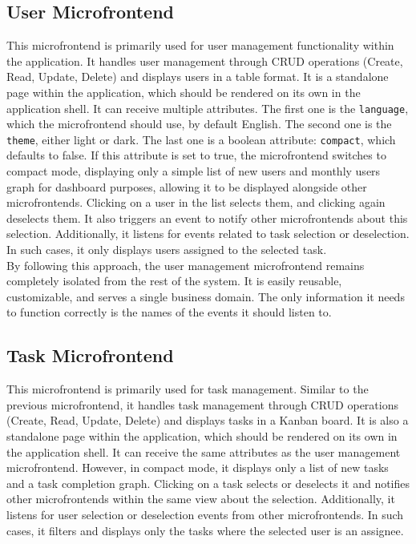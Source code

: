 \subsection{User Microfrontend}
This microfrontend is primarily used for user management functionality within the application. It handles user management through CRUD operations (Create, Read, Update, Delete) and displays users in a table format. It is a standalone page within the application, which should be rendered on its own in the application shell. It can receive multiple attributes. The first one is the \texttt{language}, which the microfrontend should use, by default English. The second one is the \texttt{theme}, either light or dark. The last one is a boolean attribute: \texttt{compact}, which defaults to false. If this attribute is set to true, the microfrontend switches to compact mode, displaying only a simple list of new users and monthly users graph for dashboard purposes, allowing it to be displayed alongside other microfrontends. Clicking on a user in the list selects them, and clicking again deselects them. It also triggers an event to notify other microfrontends about this selection. Additionally, it listens for events related to task selection or deselection. In such cases, it only displays users assigned to the selected task.  \\

\noindent
By following this approach, the user management microfrontend remains completely isolated from the rest of the system. It is easily reusable, customizable, and serves a single business domain. The only information it needs to function correctly is the names of the events it should listen to.

\subsection{Task Microfrontend}
This microfrontend is primarily used for task management. Similar to the previous microfrontend, it handles task management through CRUD operations (Create, Read, Update, Delete) and displays tasks in a Kanban board. It is also a standalone page within the application, which should be rendered on its own in the application shell. It can receive the same attributes as the user management microfrontend. However, in compact mode, it displays only a list of new tasks and a task completion graph. Clicking on a task selects or deselects it and notifies other microfrontends within the same view about the selection. Additionally, it listens for user selection or deselection events from other microfrontends. In such cases, it filters and displays only the tasks where the selected user is an assignee. \\

